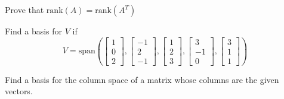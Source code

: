 \documentclass{ximera}
\begin{document}
\begin{problem}\label{prob:rankoftranspose}
Prove that $\mbox{rank}(A)=\mbox{rank}(A^T)$
\end{problem}

\begin{problem}\label{prob:basisforV}
Find a basis for $V$ if 
$$V=\mbox{span}\left( \begin{bmatrix}1\\0\\2\end{bmatrix}, \begin{bmatrix}-1\\2\\-1\end{bmatrix}, \begin{bmatrix}1\\2\\3\end{bmatrix}, \begin{bmatrix}3\\-1\\0\end{bmatrix}, \begin{bmatrix}3\\1\\1\end{bmatrix}\right)$$
\begin{hint}
Find a basis for the column space of a matrix whose columns are the given vectors.
\end{hint}
\end{problem}
\end{document}
